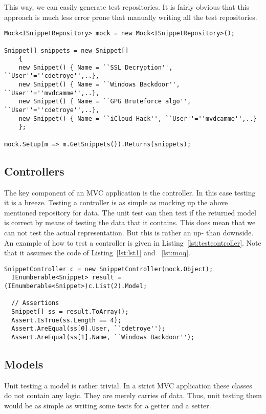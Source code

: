 \documentclass[10pt,a4paper,BCOR12mm, headexclude, footexclude,
  twoside, openright]{scrartcl}
\numberwithin{equation}{section} %
\numberwithin{figure}{section} %
\numberwithin{table}{section} %
\begin{document}
This way, we can easily generate test repositories. It is fairly obvious that
this approach is much less error prone that manually writing all the test
repositories.

\begin{lstlisting}[caption={Creating a mocking repository using Moq.}, label={lst:moq}]
Mock<ISnippetRepository> mock = new Mock<ISnippetRepository>();

Snippet[] snippets = new Snippet[] 
	{
	new Snippet() { Name = ``SSL Decryption'', ``User''=''cdetroye'',..},
	new Snippet() { Name = ``Windows Backdoor'', ``User''=''mvdcamme'',..},
	new Snippet() { Name = ``GPG Bruteforce algo'', ``User''=''cdetroye'',..},
	new Snippet() { Name = ``iCloud Hack'', ``User''=''mvdcamme'',..}
	};

mock.Setup(m => m.GetSnippets()).Returns(snippets);
\end{lstlisting}

\subsection{Controllers}
The key component of an MVC application is the controller. In this case testing
it is a breeze. Testing a controller is as simple as mocking up the above
mentioned repository for data. The unit test can then test if the returned model
is correct by means of testing the data that it contains. This does mean that we
can not test the actual representation. But this is rather an up- than
downside. An example of how to test a controller is given in
Listing~\ref{lst:testcontroller}. Note that it assumes the code of
Listing~\ref{lst:lst1} and ~\ref{lst:moq}.

\begin{lstlisting}[caption={Testing the model of a controller using Moq and Ninject.}, label={lst:testcontroller}]
  SnippetController c = new SnippetController(mock.Object);
  IEnumberable<Snippet> result = (IEnumberable<Snippet>)c.List(2).Model;

  // Assertions
  Snippet[] ss = result.ToArray();
  Assert.IsTrue(ss.Length == 4);
  Assert.AreEqual(ss[0].User, ``cdetroye'');
  Assert.AreEqual(ss[1].Name, ``Windows Backdoor'');
\end{lstlisting}

\subsection{Models}
Unit testing a model is rather trivial. In a strict MVC application these
classes do not contain any logic. They are merely carries of data. Thus, unit
testing them would be as simple as writing some tests for a getter and a setter.
\end{document}
